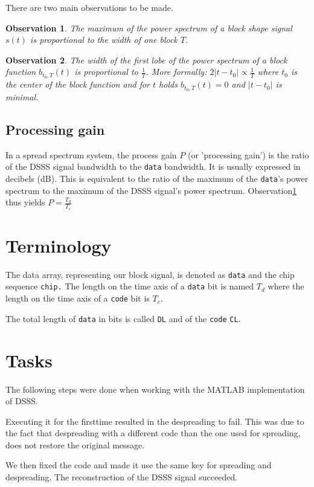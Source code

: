 \documentclass[12pt,a4paper]{article}
\newtheorem{theorem}{Observation}
\begin{document}
	
	There are two main observations to be made.
	\begin{theorem}\label{maximum}
		The maximum of the power spectrum of a block shape signal $s(t)$ is proportional to the width of one block $T$.
	\end{theorem}
	\begin{theorem}\label{lobe}
		The width of the first lobe of the power spectrum of a block function $b_{t_0,T}(t)$ is proportional to $\frac{1}{T}$.
		More formally: $2\left| t-t_0 \right| \propto \frac{1}{T}$ where $t_0$ is the center of the block function and for $t$ holds $b_{t_0,T}(t) = 0$ and $\left|t -t_0\right|$ is minimal.
	\end{theorem}
	
	\subsection{Processing gain}
	In a spread spectrum system, the process gain $P$ (or 'processing gain') is the ratio of the DSSS signal bandwidth to the \texttt{data} bandwidth. It is usually expressed in decibels (dB). This is equivalent to the ratio of the maximum of the \texttt{data}'s power spectrum to the maximum of the DSSS signal's power spectrum. Observation\ref{maximum} thus yields $P = \frac{T_d}{T_c}$
	
	\section{Terminology}
	The data array, representing our block signal, is denoted as \texttt{data} and the chip sequence \texttt{chip.}
	The length on the time axis of a \texttt{data} bit is  named \texttt{$T_d$} where the length on the time axis of a \texttt{code} bit is \texttt{$T_c$}.
	
	The total length of \texttt{data} in bits is called \texttt{DL} and of the \texttt{code} \texttt{CL}.
	
	
	\section{Tasks}
		The following steps were done when working with the MATLAB implementation of DSSS.
		
		Executing it for the firsttime resulted in the despreading to fail.
		This was due to the fact that despreading with a different code than the one used for spreading, does not restore the original message.
		
		We then fixed the code and made it use the same key for spreading and despreading. The reconstruction of the DSSS 
		signal succeeded.
		
\end{document}
